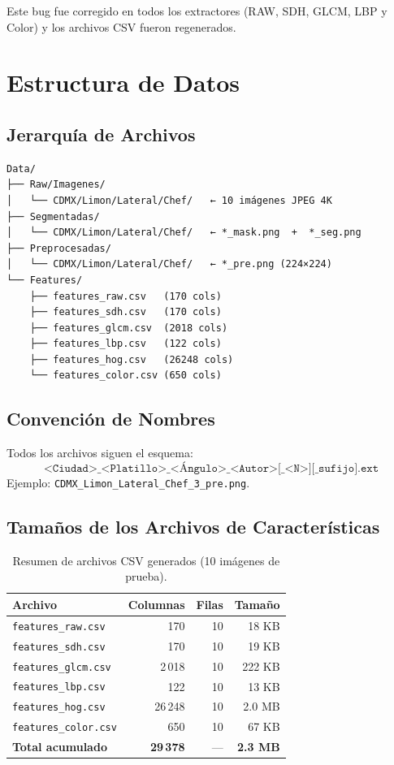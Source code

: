 \documentclass[12pt,a4paper]{article}
\begin{document}
Este bug fue corregido en todos los extractores (RAW, SDH, GLCM,
LBP y Color) y los archivos CSV fueron regenerados.

\section{Estructura de Datos}

\subsection{Jerarquía de Archivos}

\begin{verbatim}
Data/
├── Raw/Imagenes/
│   └── CDMX/Limon/Lateral/Chef/   ← 10 imágenes JPEG 4K
├── Segmentadas/
│   └── CDMX/Limon/Lateral/Chef/   ← *_mask.png  +  *_seg.png
├── Preprocesadas/
│   └── CDMX/Limon/Lateral/Chef/   ← *_pre.png (224×224)
└── Features/
    ├── features_raw.csv   (170 cols)
    ├── features_sdh.csv   (170 cols)
    ├── features_glcm.csv  (2018 cols)
    ├── features_lbp.csv   (122 cols)
    ├── features_hog.csv   (26248 cols)
    └── features_color.csv (650 cols)
\end{verbatim}

\subsection{Convención de Nombres}

Todos los archivos siguen el esquema:
\[
  \texttt{<Ciudad>\_<Platillo>\_<Ángulo>\_<Autor>[\_<N>][\_sufijo].ext}
\]
Ejemplo: \texttt{CDMX\_Limon\_Lateral\_Chef\_3\_pre.png}.

\subsection{Tamaños de los Archivos de Características}

\begin{table}[H]
\centering
\caption{Resumen de archivos CSV generados (10 imágenes de prueba).}
\label{tab:csvs}
\begin{tabular}{@{}lrrr@{}}
\toprule
\textbf{Archivo} & \textbf{Columnas} & \textbf{Filas} & \textbf{Tamaño} \\
\midrule
\texttt{features\_raw.csv}   & 170    & 10 &  18 KB \\
\texttt{features\_sdh.csv}   & 170    & 10 &  19 KB \\
\texttt{features\_glcm.csv}  & 2\,018 & 10 & 222 KB \\
\texttt{features\_lbp.csv}   & 122    & 10 &  13 KB \\
\texttt{features\_hog.csv}   & 26\,248& 10 & 2.0 MB \\
\texttt{features\_color.csv} & 650    & 10 &  67 KB \\
\midrule
\textbf{Total acumulado} & \textbf{29\,378} & --- & \textbf{2.3 MB} \\
\bottomrule
\end{tabular}
\end{table}
\end{document}

